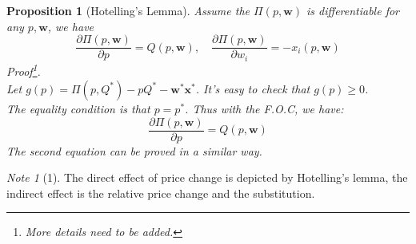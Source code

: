 \documentclass{article}
\theoremstyle{plain}
\newtheorem{prop}[thm]{Proposition}
\theoremstyle{definition}
\theoremstyle{remark}
\newtheorem*{note}{Note}
\begin{document}
\begin{prop}[Hotelling's Lemma]
Assume the $\Pi(p,\bm{w})$ is differentiable for any $p,\bm{w}$, we have
\begin{equation}
\frac{\partial \Pi(p,\bm{w})}{\partial p} = Q(p,\bm{w}),  \quad \frac{\partial \Pi(p,\bm{w})}{\partial w_i} = - x_i(p,\bm{w})
\end{equation}
Proof\footnote{More details need to be added.}.\\
Let $g(p) = \Pi(p,Q^{*}) - pQ^{*} - \bm{w^{*}}\bm{x^{*}}$. It's easy to check that $g(p)\geq 0$.\\
The equality condition is that $p=p^{*}$. Thus with the F.O.C, we have:
\begin{equation}
\frac{\partial \Pi(p,\bm{w})}{\partial p} = Q(p,\bm{w})
\end{equation}
The second equation can be proved in a similar way.
\end{prop}
\begin{note}[1]
The direct effect of price change is depicted by Hotelling's lemma, the indirect effect is the relative price change and the substitution.
\end{note}
\end{document}
